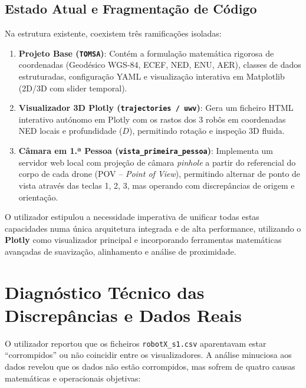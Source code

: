 \documentclass[11pt,a4paper]{article}
\begin{document}
\subsection{Estado Atual e Fragmentação de Código}
Na estrutura existente, coexistem três ramificações isoladas:
\begin{enumerate}
    \item \textbf{Projeto Base (\texttt{TOMSA})}: Contém a formulação matemática rigorosa de coordenadas (Geodésico WGS-84, ECEF, NED, ENU, AER), classes de dados estruturadas, configuração YAML e visualização interativa em Matplotlib (2D/3D com slider temporal).
    \item \textbf{Visualizador 3D Plotly (\texttt{trajectories / uwv})}: Gera um ficheiro HTML interativo autónomo em Plotly com os rastos dos 3 robôs em coordenadas NED locais e profundidade ($D$), permitindo rotação e inspeção 3D fluida.
    \item \textbf{Câmara em 1.ª Pessoa (\texttt{vista\_primeira\_pessoa})}: Implementa um servidor web local com projeção de câmara \textit{pinhole} a partir do referencial do corpo de cada drone (POV -- \textit{Point of View}), permitindo alternar de ponto de vista através das teclas 1, 2, 3, mas operando com discrepâncias de origem e orientação.
\end{enumerate}

O utilizador estipulou a necessidade imperativa de unificar todas estas capacidades numa única arquitetura integrada e de alta performance, utilizando o \textbf{Plotly} como visualizador principal e incorporando ferramentas matemáticas avançadas de suavização, alinhamento e análise de proximidade.

\section{Diagnóstico Técnico das Discrepâncias e Dados Reais}

O utilizador reportou que os ficheiros \texttt{robotX\_s1.csv} aparentavam estar ``corrompidos'' ou não coincidir entre os visualizadores. A análise minuciosa aos dados revelou que os dados não estão corrompidos, mas sofrem de quatro causas matemáticas e operacionais objetivas:
\end{document}
